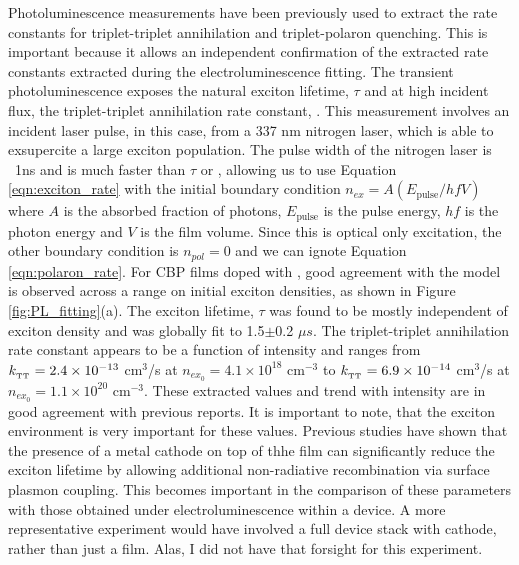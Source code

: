 \documentclass[../thesis.tex]{subfiles}
\begin{document}
Photoluminescence measurements have been previously used to extract the rate constants for triplet-triplet annihilation and triplet-polaron quenching.\supercite{Erickson2014,Reineke2007}
This is important because it allows an independent confirmation of the extracted rate constants extracted during the electroluminescence fitting.
The transient photoluminescence exposes the natural exciton lifetime, $\tau$ and at high incident flux, the triplet-triplet annihilation rate constant, \ktt.
This measurement involves an incident laser pulse, in this case, from a 337 nm nitrogen laser, which is able to exsupercite a large exciton population.
The pulse width of the nitrogen laser is ~1ns and is much faster than $\tau$ or \ktt, allowing us to use Equation \ref{eqn:exciton_rate} with the initial boundary condition $n_{ex}=A(E_{\text{pulse}}/hfV)$ where $A$ is the absorbed fraction of photons, $E_{\text{pulse}}$ is the pulse energy, $hf$ is the photon energy and $V$ is the film volume.
Since this is optical only excitation, the other boundary condition is $n_{pol}=0$ and we can ignote Equation \ref{eqn:polaron_rate}.\supercite{Reineke2007,Erickson2014,Baldo2000a}
For CBP films doped with \irppy, good agreement with the model is observed across a range on initial exciton densities, as shown in Figure \ref{fig:PL_fitting}(a).
The exciton lifetime, $\tau$ was found to be mostly independent of exciton density and was globally fit to 1.5$\pm$0.2 $\mu s$.  
The triplet-triplet annihilation rate constant appears to be a function of intensity and ranges from $k_{_\text{\tiny TT}}=2.4\times10^{-13}$ cm$^3$/s at $n_{ex_0}=4.1\times10^{18}$ cm$^{-3}$ to $k_{_\text{\tiny TT}}=6.9\times10^{-14}$ cm$^3$/s at $n_{ex_0}=1.1\times10^{20}$ cm$^{-3}$.
These extracted values and trend with intensity are in good agreement with previous reports.\supercite{Reineke2007,Erickson2014,Staroske2007}
It is important to note, that the exciton environment is very important for these values.  
Previous studies have shown that the presence of a metal cathode on top of thhe film can significantly reduce the exciton lifetime by allowing additional non-radiative recombination via surface plasmon coupling.\supercite{Song2011}
This becomes important in the comparison of these parameters with those obtained under electroluminescence within a device.
A more representative experiment would have involved a full device stack with cathode, rather than just a film.  
Alas, I did not have that forsight for this experiment.
\end{document}
